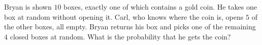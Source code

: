 Bryan is shown $10$ boxes, exactly one of which contains a gold coin. He takes one box at random without opening it. Carl, who knows where the coin is, opens $5$ of the other boxes, all empty. Bryan returns his box and picks one of the remaining $4$ closed boxes at random. What is the probability that he gets the coin?
